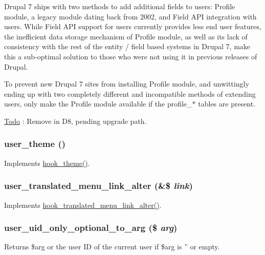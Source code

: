 Drupal 7 ships with two methods to add additional fields to users: Profile module, a legacy module dating back from 2002, and Field API integration with users. While Field API support for users currently provides less end user features, the inefficient data storage mechanism of Profile module, as well as its lack of consistency with the rest of the entity / field based systems in Drupal 7, make this a sub-\/optimal solution to those who were not using it in previous releases of Drupal.

To prevent new Drupal 7 sites from installing Profile module, and unwittingly ending up with two completely different and incompatible methods of extending users, only make the Profile module available if the profile\_\-$\ast$ tables are present.

\begin{Desc}
\item[\hyperlink{todo__todo000028}{Todo}]: Remove in D8, pending upgrade path. \end{Desc}
\hypertarget{user_8module_a4ca455e4035589f0235f705d376f38c7}{
\subsubsection[{user\_\-theme}]{\setlength{\rightskip}{0pt plus 5cm}user\_\-theme ()}}
\label{user_8module_a4ca455e4035589f0235f705d376f38c7}
Implements \hyperlink{group__hooks_ga013ccb45c7aaab1c16cf9691428c910d}{hook\_\-theme()}. \hypertarget{user_8module_adfd500d7a85faa0058757c6b66fdabda}{
\subsubsection[{user\_\-translated\_\-menu\_\-link\_\-alter}]{\setlength{\rightskip}{0pt plus 5cm}user\_\-translated\_\-menu\_\-link\_\-alter (\&\$ {\em link})}}
\label{user_8module_adfd500d7a85faa0058757c6b66fdabda}
Implements \hyperlink{group__hooks_ga5b5395b90c4987e29c6f6430fc066e8c}{hook\_\-translated\_\-menu\_\-link\_\-alter()}. \hypertarget{user_8module_acafbef09764866dee15f8cf2b184aafc}{
\subsubsection[{user\_\-uid\_\-only\_\-optional\_\-to\_\-arg}]{\setlength{\rightskip}{0pt plus 5cm}user\_\-uid\_\-only\_\-optional\_\-to\_\-arg (\$ {\em arg})}}
\label{user_8module_acafbef09764866dee15f8cf2b184aafc}
Returns \$arg or the user ID of the current user if \$arg is '' or empty.


